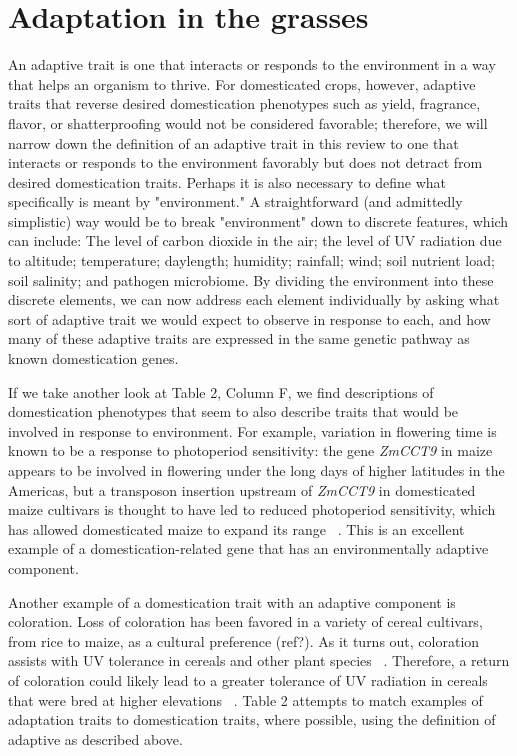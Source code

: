 \documentclass[12pt]{article}
\begin{document}
\section*{Adaptation in the grasses}
An adaptive trait is one that interacts or responds to the environment in a way that helps an organism to thrive. For domesticated crops, however, adaptive traits that reverse desired domestication phenotypes such as yield, fragrance, flavor, or shatterproofing would not be considered favorable; therefore, we will narrow down the definition of an adaptive trait in this review to one that interacts or responds to the environment favorably but does not detract from desired domestication traits.  Perhaps it is also necessary to define what specifically is meant by "environment." A straightforward (and admittedly simplistic) way would be to break  "environment" down to discrete features, which can include: The level of carbon dioxide in the air; the level of UV radiation due to altitude; temperature; daylength; humidity; rainfall; wind; soil nutrient load; soil salinity; and pathogen microbiome.  By dividing the environment into these discrete elements, we can now address each element individually by asking what sort of adaptive trait we would expect to observe in response to each, and how many of these adaptive traits are expressed in the same genetic pathway as known domestication genes. 

If we take another look at Table 2, Column F, we find descriptions of domestication phenotypes that seem to also describe traits that would be involved in response to environment. For example, variation in flowering time is known to be a response to photoperiod sensitivity: the gene \textit{ZmCCT9} in maize appears to be involved in flowering under the long days of higher latitudes in the Americas, but a transposon insertion upstream of \textit{ZmCCT9} in domesticated maize cultivars is thought to have led to reduced photoperiod sensitivity, which has allowed domesticated maize to expand its range ~\citep{Huang2017}.  This is an excellent example of a domestication-related gene that has an environmentally adaptive component. 

Another example of a domestication trait with an adaptive component is coloration. Loss of coloration has been favored in a variety of cereal cultivars, from rice to maize, as a cultural preference (ref?). As it turns out, coloration assists with UV tolerance in cereals and other plant species ~\citep{pmid8058838, Gould2004}. Therefore, a return of coloration could likely lead to a greater tolerance of UV radiation in cereals that were bred at higher elevations ~\citep{Pyhjrvi2013}.  Table 2 attempts to match examples of adaptation traits to domestication traits, where possible, using the definition of adaptive as described above. 
\end{document}
